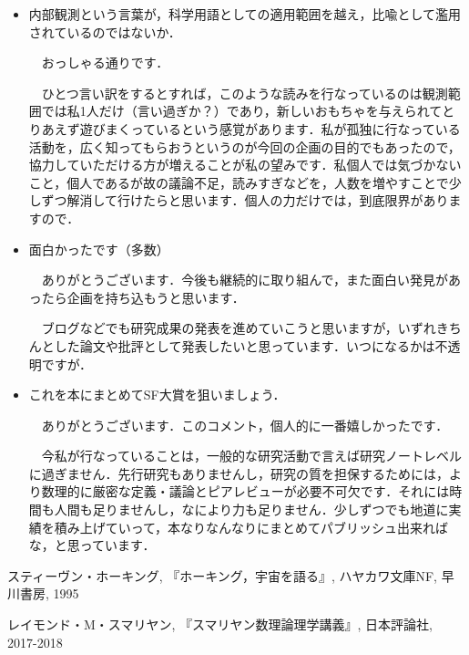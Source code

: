 \documentclass[10pt, a5paper, twoside]{jsarticle}
\begin{document}
		\begin{itemize}

			\item 内部観測という言葉が，科学用語としての適用範囲を越え，比喩として濫用されているのではないか．

			\vspace{1mm}

			　おっしゃる通りです．

			　ひとつ言い訳をするとすれば，このような読みを行なっているのは観測範囲では私1人だけ（言い過ぎか？）であり，新しいおもちゃを与えられてとりあえず遊びまくっているという感覚があります．私が孤独に行なっている活動を，広く知ってもらおうというのが今回の企画の目的でもあったので，協力していただける方が増えることが私の望みです．私個人では気づかないこと，個人であるが故の議論不足，読みすぎなどを，人数を増やすことで少しずつ解消して行けたらと思います．個人の力だけでは，到底限界がありますので．

			\vspace{2mm}

			\item 面白かったです（多数）

			\vspace{1mm}

			　ありがとうございます．今後も継続的に取り組んで，また面白い発見があったら企画を持ち込もうと思います．

			　ブログなどでも研究成果の発表を進めていこうと思いますが，いずれきちんとした論文や批評として発表したいと思っています．いつになるかは不透明ですが．

			\vspace{2mm}

			\item これを本にまとめてSF大賞を狙いましょう．

			\vspace{1mm}

			　ありがとうございます．このコメント，個人的に一番嬉しかったです．

			　今私が行なっていることは，一般的な研究活動で言えば研究ノートレベルに過ぎません．先行研究もありませんし，研究の質を担保するためには，より数理的に厳密な定義・議論とピアレビューが必要不可欠です．それには時間も人間も足りませんし，なにより力も足りません．少しずつでも地道に実績を積み上げていって，本なりなんなりにまとめてパブリッシュ出来ればな，と思っています．

		\end{itemize}


	\begin{thebibliography}{99}

		 スティーヴン・ホーキング, 『ホーキング，宇宙を語る』, ハヤカワ文庫NF, 早川書房, 1995
		
		 レイモンド・M・スマリヤン, 『スマリヤン数理論理学講義』, 日本評論社, 2017-2018

	\end{thebibliography}
\end{document}

